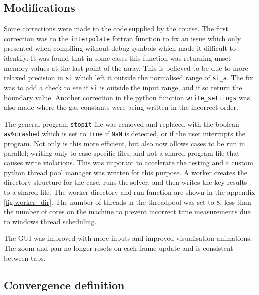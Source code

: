 \documentclass{article}
\begin{document}
\subsection{Modifications}

Some corrections were made to the code supplied by the course.
The first correction was to the \texttt{interpolate} fortran function to fix an issue which only presented when compiling without debug symbols which made it difficult to identify.
It was found that in some cases this function was returning unset memory values at the last point of the array. This is believed to be due to more relaxed precision in \texttt{si} which left it outside the normalised range of \texttt{si\_a}.
The fix was to add a check to see if \texttt{si} is outside the input range, and if so return the boundary value.
Another correction in the python function \texttt{write\_settings} was also made where the gas constants were being written in the incorrect order.

The general program \texttt{stopit} file was removed and replaced with the boolean \texttt{av\%crashed} which is set to \texttt{True} if \texttt{NaN} is detected, or if the user interrupts the program.
Not only is this more efficient, but also now allows cases to be run in parallel; writing only to case specific files, and not a shared program file that causes write violations.
This was imporant to accelerate the testing and a custom python thread pool manager was written for this purpose.
A worker creates the directory structure for the case, runs the solver, and then writes the key results to a shared file.
The worker directory and run function are shown in the appendix \ref{fig:worker_dir}.
The number of threads in the threadpool was set to 8, less than the number of cores on the machine to prevent incorrect time measurements due to windows thread scheduling.

The GUI was improved with more inputs and improved visualisation animations.
The zoom and pan no longer resets on each frame update and is consistent between tabs.

\subsection{Convergence definition}
\end{document}
